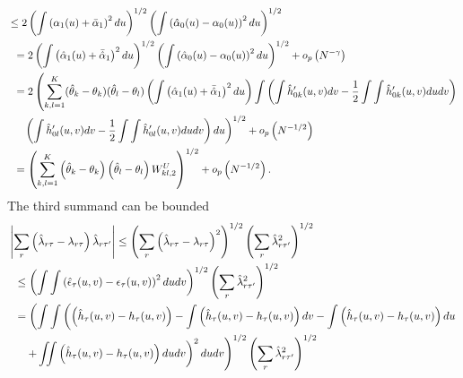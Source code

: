 \documentclass[12pt]{article}
\theoremstyle{definition}
\begin{document}
{\begin{align*}
&\leq 2 \left( \int \left( \alpha_1(u) + \bar{\alpha}_1\right)^2du\right)^{1/2}\left(\int\left( \hat{\alpha}_0(u) - \alpha_0(u)\right)^{2}du\right)^{1/2}\\
&\hspace{2mm}= 2 \left( \int \left( \hat{\alpha}_1(u) + \bar{\hat{\alpha}}_1\right)^2du\right)^{1/2}\left(\int\left( \hat{\alpha}_0(u) - \alpha_0(u)\right)^{2}du\right)^{1/2} + o_{p}\left(N^{-\gamma}\right)\\
&\hspace{2mm}= 2 \left(\sum_{k,l=1}^{K}(\hat{\theta}_{k}- \theta_{k})(\hat{\theta}_{l}- \theta_{l})\left( \int \left( \hat{\alpha}_1(u) + \bar{\hat{\alpha}}_1\right)^2du\right)\int \left(\int \hat{h}'_{0k}(u,v)dv - \frac{1}{2}\int\int \hat{h}'_{0k}(u,v)dudv\right) \right.\\
&\hspace{5mm}\left.\left(\int \hat{h}'_{0l}(u,v)dv - \frac{1}{2}\int\int \hat{h}'_{0l}(u,v)dudv\right)du\right)^{1/2} + o_{p}\left( N^{-1/2}\right) \\
&\hspace{2mm} = \left(\sum_{k,l=1}^{K} \left(\hat{\theta}_{k} - \theta_{k}\right)\left(\hat{\theta}_{l} - \theta_{l}\right)W^{U}_{kl,2}\right)^{1/2}  + o_{p}\left( N^{-1/2}\right).
\end{align*}
The third summand can be bounded  
\begin{align*}
&\left|\sum_{r}\left(\hat{\lambda}_{r\tau} - \lambda_{r\tau}\right)\hat{\lambda}_{r\tau'} \right| 
\leq \left(\sum_{r} \left(\hat{\lambda}_{r\tau} - \lambda_{r\tau}\right)^{2}\right)^{1/2}\left(\sum_{r} \hat{\lambda}_{r\tau'}^{2}\right)^{1/2} \\
&\hspace{2mm}\leq \left(\int\int \left(\hat{\epsilon}_{\tau}(u,v) - \epsilon_{\tau}(u,v)\right)^{2}dudv\right)^{1/2}\left(\sum_{r} \hat{\lambda}_{r\tau'}^{2}\right)^{1/2}  \\
&\hspace{2mm}= \left(\int\int \left(\left(\hat{h}_{\tau}(u,v) - h_{\tau}(u,v)\right) - \int\left(\hat{h}_{\tau}(u,v) - h_{\tau}(u,v)\right)dv - \int\left(\hat{h}_{\tau}(u,v) - h_{\tau}(u,v)\right)du \right.\right.\\
&\hspace{5mm}\left.\left.  + \iint \left(\hat{h}_{\tau}(u,v) - h_{\tau}(u,v)\right)dudv\right)^{2}dudv\right)^{1/2}\left(\sum_{r} \hat{\lambda}_{r\tau'}^{2}\right)^{1/2} 
\end{align*}
\begin{align*}

\end{align*}}
\end{document}
